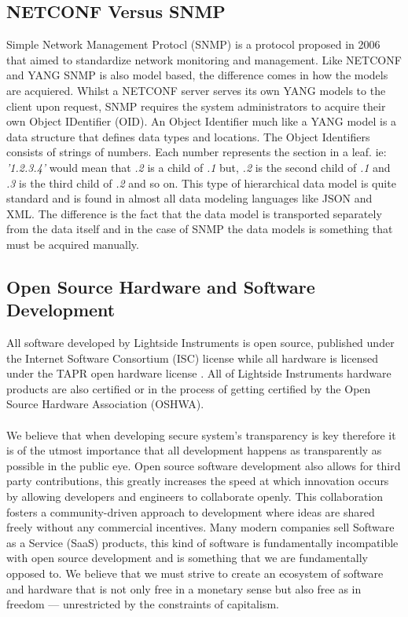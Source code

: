 \documentclass[12pt]{article}
\begin{document}
\subsection{NETCONF Versus SNMP}
Simple Network Management Protocl (SNMP) \cite{schonwalderSimpleNetworkManagement2006} is a protocol proposed in 2006 that aimed 
to standardize network monitoring and management. Like NETCONF and YANG SNMP is also model based, the difference comes in how the models are acquiered.
Whilst a NETCONF server serves its own YANG models to the client upon request, SNMP requires the system administrators to acquire their own Object IDentifier (OID).
An Object Identifier much like a YANG model is a data structure that defines data types and locations. The Object Identifiers consists of strings of numbers.
Each number represents the section in a leaf. ie: \textit{'1.2.3.4'} would mean that \textit{.2} is a child of \textit{.1} but, \textit{.2} is the second child of \textit{.1} and \textit{.3} 
is the third child of \textit{.2} and so on.
This type of hierarchical data model is quite standard and is found in almost all data modeling languages like JSON and XML. The difference is the fact that the data model 
is transported separately from the data itself and in the case of SNMP the data models is something that must be acquired manually.


\subsection{Open Source Hardware and Software Development}
All software developed by Lightside Instruments is open source, published under 
the Internet Software Consortium (ISC) license \cite{consortiumISCOpenSource2024} while 
all hardware is licensed under the TAPR open hardware license \cite{TAPROpenHardware}. 
All of Lightside Instruments hardware products are also certified or in the 
process of getting certified by the Open Source Hardware Association (OSHWA).
\\
\\
We believe that when developing secure system's transparency is key therefore it is of the 
utmost importance that all development happens as transparently as possible in the public eye.
Open source software development also allows for third party contributions, this greatly 
increases the speed at which innovation occurs by allowing developers and engineers to collaborate openly. 
This collaboration fosters a community-driven approach to development where ideas are shared freely 
without any commercial incentives.
Many modern companies sell Software as a Service (SaaS) products, this kind of software is fundamentally 
incompatible with open source development and is something that we are fundamentally opposed to.
We believe that we must strive to create an ecosystem of software and hardware that is not only free in a
monetary sense but also free as in freedom — unrestricted by the constraints of capitalism.
\end{document}
